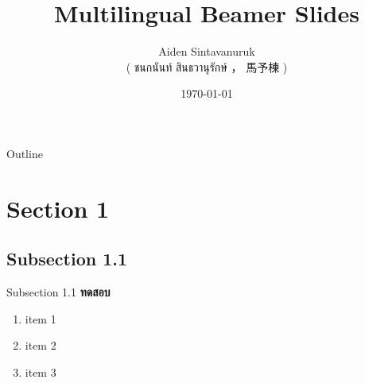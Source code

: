 \documentclass{beamer}
\title{Multilingual Beamer Slides}
\author[shortname]{
	Aiden Sintavanuruk \\ ( ชนกนันท์ สินธวานุรักษ์ ， 馬予棟 ) \inst{1}
}
\institute[shortinst]{\inst{1} affiliation
}
\date{\today}
\begin{document}
\begin{frame}
	\titlepage
\end{frame}

\begin{frame}{Outline}
	\tableofcontents
\end{frame}

\section{Section 1}
\subsection{Subsection 1.1}
\begin{frame}{Subsection 1.1}
	\textbf{ทดสอบ}
	\begin{enumerate}
		\item<1-> item 1
		\item<2-> item 2
		\item<3-> item 3
	\end{enumerate}
\end{frame}
\end{document}
